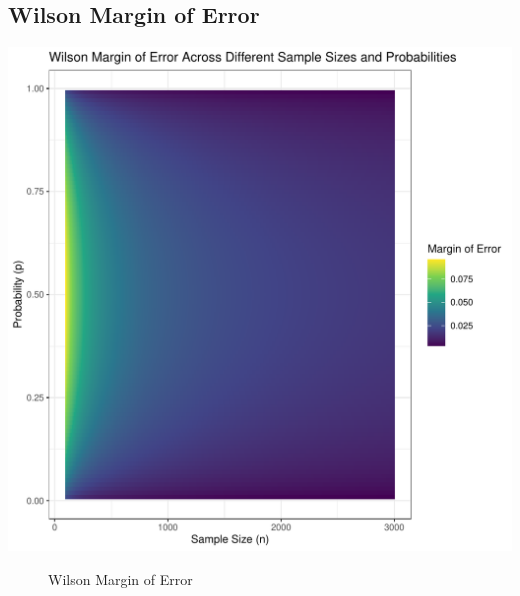 \documentclass{article}\usepackage[]{graphicx}\usepackage[]{xcolor}
\makeatletter
\def\maxwidth{ %
  \ifdim\Gin@nat@width>\linewidth
    \linewidth
  \else
    \Gin@nat@width
  \fi
}
\newenvironment{knitrout}{}{} %
\makeatother
\begin{document}
\subsection{Wilson Margin of Error}
\begin{knitrout}\scriptsize
{}\color{fgcolor}
\includegraphics[width=\maxwidth]{figure/plot4-1} 
\end{knitrout}

\begin{figure}[H]
\begin{center}

\caption{Wilson Margin of Error}
\label{wilson} %
\end{center}
\end{figure}
\end{document}
